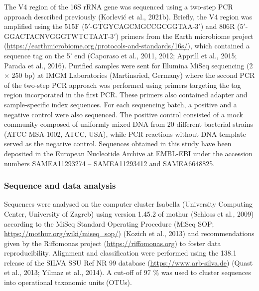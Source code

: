 \documentclass[12pt,]{article}
\begin{document}
The V4 region of the 16S rRNA gene was sequenced using a two-step PCR
approach described previously (Korlević et al., 2021b). Briefly, the V4
region was amplified using the 515F (\(5'\)-GTGYCAGCMGCCGCGGTAA-\(3'\))
and 806R (\(5'\)-GGACTACNVGGGTWTCTAAT-\(3'\)) primers from the Earth
microbiome project
(\url{https://earthmicrobiome.org/protocols-and-standards/16s/}), which
contained a sequence tag on the 5' end (Caporaso et al., 2011, 2012;
Apprill et al., 2015; Parada et al., 2016). Purified samples were sent
for Illumina MiSeq sequencing (2 × 250 bp) at IMGM Laboratories
(Martinsried, Germany) where the second PCR of the two-step PCR approach
was performed using primers targeting the tag region incorporated in the
first PCR. These primers also contained adapter and sample-specific
index sequences. For each sequencing batch, a positive and a negative
control were also sequenced. The positive control consisted of a mock
community composed of uniformly mixed DNA from 20 different bacterial
strains (ATCC MSA-1002, ATCC, USA), while PCR reactions without DNA
template served as the negative control. Sequences obtained in this
study have been deposited in the European Nucleotide Archive at EMBL-EBI
under the accession numbers SAMEA11293274 -- SAMEA11293412 and
SAMEA6648825.

\hypertarget{sequence-and-data-analysis}{%
\subsubsection{Sequence and data
analysis}\label{sequence-and-data-analysis}}

Sequences were analysed on the computer cluster Isabella (University
Computing Center, University of Zagreb) using version 1.45.2 of mothur
(Schloss et al., 2009) according to the MiSeq Standard Operating
Procedure (MiSeq SOP; \url{https://mothur.org/wiki/miseq_sop/}) (Kozich
et al., 2013) and recommendations given by the Riffomonas project
(\url{https://riffomonas.org}) to foster data reproducibility. Alignment
and classification were performed using the 138.1 release of the SILVA
SSU Ref NR 99 database (\url{https://www.arb-silva.de}) (Quast et al.,
2013; Yilmaz et al., 2014). A cut-off of 97 \% was used to cluster
sequences into operational taxonomic units (OTUs).
\end{document}

